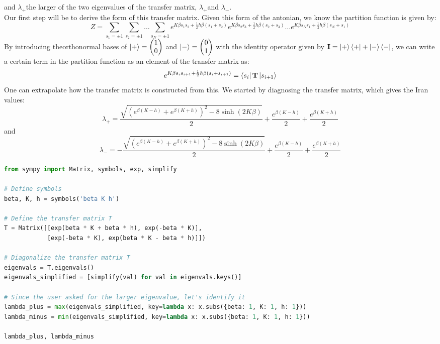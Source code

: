 \documentclass[12pt]{article}
\begin{document}
and $\lambda_{+}$the larger of the two eigenvalues of the transfer matrix, $\lambda_{+}$and $\lambda_{-}$.\\
Our first step will be to derive the form of this transfer matrix. Given this form of the antonian, we know the partition function is given by:
\begin{equation}
Z = \sum_{s_{1} = \pm 1} \sum_{s_{2} = \pm 1} \ldots \sum_{s_{N} = \pm 1} e^{K\beta s_{1}s_{2}+\frac{1}{2}h\beta\left(s_{1}+s_{2}\right)} e^{K\beta s_{2}s_{3}+\frac{1}{2}h\beta\left(s_{2}+s_{3}\right)} \ldots e^{K\beta s_{N}s_{1}+\frac{1}{2}h\beta\left(s_{N}+s_{1}\right)}
\end{equation}
By introducing theorthonormal bases of $\ket{+}= \begin{pmatrix} 1 \\ 0 \end{pmatrix}$ and $\ket{-}= \begin{pmatrix} 0 \\ 1 \end{pmatrix}$ with the identity operator given by $\textbf{I} = \ket{+}\bra{+} + \ket{-}\bra{-}$, we can write a certain term in the partition function as an element of the transfer matrix as:
\begin{equation}
e^{K\beta s_{i}s_{i+1}+\frac{1}{2}h\beta\left(s_{i}+s_{i+1}\right)} = \bra{s_i}\textbf{T}\ket{s_{i+1}}
\end{equation}
One can extrapolate how the transfer matrix is constructed from this.
We started by diagnosing the transfer matrix, which gives the Iran values:
\begin{equation}
  \lambda_{+} = \frac{\sqrt{\left(e^{\beta(K - h)} + e^{\beta(K + h)}\right)^2 - 8\sinh(2K\beta)}}{2} + \frac{e^{\beta(K - h)}}{2} + \frac{e^{\beta(K + h)}}{2}
\end{equation}
and
\begin{equation}
  \lambda_{-} = -\frac{\sqrt{\left(e^{\beta(K - h)} + e^{\beta(K + h)}\right)^2 - 8\sinh(2K\beta)}}{2} + \frac{e^{\beta(K - h)}}{2} + \frac{e^{\beta(K + h)}}{2}
\end{equation}
\begin{lstlisting}[language=Python]
from sympy import Matrix, symbols, exp, simplify

# Define symbols
beta, K, h = symbols('beta K h')

# Define the transfer matrix T
T = Matrix([[exp(beta * K + beta * h), exp(-beta * K)],
            [exp(-beta * K), exp(beta * K - beta * h)]])

# Diagonalize the transfer matrix T
eigenvals = T.eigenvals()
eigenvals_simplified = [simplify(val) for val in eigenvals.keys()]

# Since the user asked for the larger eigenvalue, let's identify it
lambda_plus = max(eigenvals_simplified, key=lambda x: x.subs({beta: 1, K: 1, h: 1}))
lambda_minus = min(eigenvals_simplified, key=lambda x: x.subs({beta: 1, K: 1, h: 1}))

lambda_plus, lambda_minus
\end{lstlisting}
\end{document}
